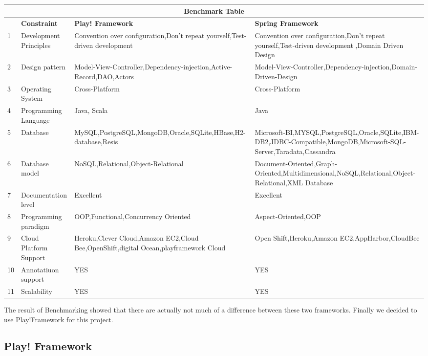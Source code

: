 \begin{center}
	

\begin{tabular}{ |l||l|p{7cm}|p{6cm}|  }
 \hline
 \multicolumn{4}{|c|}{\textbf{Benchmark Table}} \\
 \hline
 ~ & \textbf{Constraint} & \textbf{Play! Framework} & \textbf{Spring Framework}\\
 \hline
 1   & Development Principles & Convention over configuration,Don't repeat yourself,Test-driven development & Convention over configuration,Don't repeat yourself,Test-driven development ,Domain Driven Design   \\
 \hline
 2 & Design pattern & Model-View-Controller,Dependency-injection,Active-Record,DAO,Actors & Model-View-Controller,Dependency-injection,Domain-Driven-Design \\
 \hline
 3 &Operating System & Cross-Platform&  Cross-Platform\\
 \hline
 4 &Programming Language & Java, Scala &  Java\\
 \hline
 5& Database  & MySQL,PostgreSQL,MongoDB,Oracle,SQLite,HBase,H2-database,Resis& Microsoft-BI,MYSQL,PostgreSQL,Oracle,SQLite,IBM-DB2,JDBC-Compatible,MongoDB,Microsoft-SQL-Server,Taradata,Cassandra\\
 \hline
 6&   Database model  & NoSQL,Relational,Object-Relational & Document-Oriented,Graph-Oriented,Multidimensional,NoSQL,Relational,Object-Relational,XML Database\\
 \hline
 7&   Documentation level & Excellent&Excellent\\
 \hline
 8&   Programming paradigm  & OOP,Functional,Concurrency Oriented&Aspect-Oriented,OOP\\
 \hline
 9&   Cloud Platform Support  & Heroku,Clever Cloud,Amazon EC2,Cloud Bee,OpenShift,digital Ocean,playframework Cloud & Open Shift,Heroku,Amazon EC2,AppHarbor,CloudBee\\
 \hline
 10&   Annotatiuon support & YES & YES\\
 \hline
 11&   Scalability & YES&YES\\
 \hline
\end{tabular}
\end{center}

The result of Benchmarking showed that there are actually not much of a difference between these two frameworks. Finally we decided to use Play!Framework for this project.

\subsection{Play! Framework}


